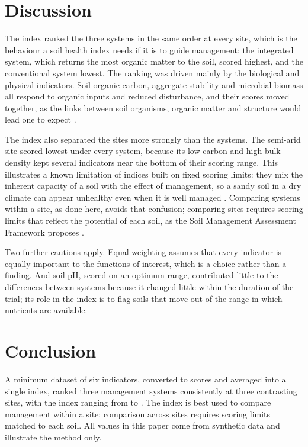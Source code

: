 \section{Discussion}

The index ranked the three systems in the same order at every site, which is
the behaviour a soil health index needs if it is to guide management: the
integrated system, which returns the most organic matter to the soil, scored
highest, and the conventional system lowest. The ranking was driven mainly by
the biological and physical indicators. Soil organic carbon, aggregate
stability and microbial biomass all respond to organic inputs and reduced
disturbance, and their scores moved together, as the links between soil
organisms, organic matter and structure would lead one to expect
\parencite{doran2000}.

The index also separated the sites more strongly than the systems. The
semi-arid site scored lowest under every system, because its low carbon and
high bulk density kept several indicators near the bottom of their scoring
range. This illustrates a known limitation of indices built on fixed scoring
limits: they mix the inherent capacity of a soil with the effect of
management, so a sandy soil in a dry climate can appear unhealthy even when it
is well managed \parencite{bunemann2018}. Comparing systems within a site, as
done here, avoids that confusion; comparing sites requires scoring limits that
reflect the potential of each soil, as the Soil Management Assessment
Framework proposes \parencite{andrews2004}.

Two further cautions apply. Equal weighting assumes that every indicator is
equally important to the functions of interest, which is a choice rather than
a finding. And soil pH, scored on an optimum range, contributed little to the
differences between systems because it changed little within the duration of
the trial; its role in the index is to flag soils that move out of the range
in which nutrients are available.

\section{Conclusion}

A minimum dataset of six indicators, converted to scores and averaged into a
single index, ranked three management systems consistently at three
contrasting sites, with the index ranging from  to
. The index is best used to compare management within a site;
comparison across sites requires scoring limits matched to each soil. All
values in this paper come from synthetic data and illustrate the method only.
